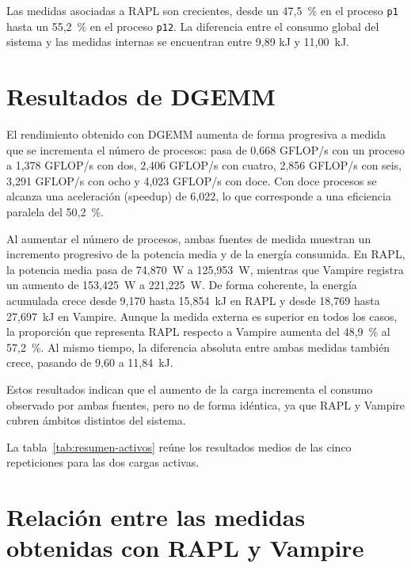 Las medidas asociadas a RAPL son crecientes, desde un 47,5~\% en el proceso \texttt{p1} hasta un 55,2~\% en el proceso \texttt{p12}. La diferencia entre el consumo global del sistema y las medidas internas se encuentran entre 9,89 kJ y 11,00~kJ. 

\section{Resultados de DGEMM}
\label{sec:resultados-dgemm}

El rendimiento obtenido con DGEMM aumenta de forma progresiva a medida que se incrementa el número de procesos: pasa de 0,668 GFLOP/s con un proceso a 1,378 GFLOP/s con dos, 2,406 GFLOP/s con cuatro, 2,856 GFLOP/s con seis, 3,291 GFLOP/s con ocho y 4,023 GFLOP/s con doce. Con doce procesos se alcanza una aceleración (speedup) de 6,022, lo que corresponde a una eficiencia paralela del 50,2~\%.

Al aumentar el número de procesos, ambas fuentes de medida muestran un incremento progresivo de la potencia media y de la energía consumida. En RAPL, la potencia media pasa de 74,870~W a 125,953~W, mientras que Vampire registra un aumento de 153,425~W a 221,225~W. De forma coherente, la energía acumulada crece desde 9,170 hasta 15,854~kJ en RAPL y desde 18,769 hasta 27,697~kJ en Vampire. Aunque la medida externa es superior en todos los casos, la proporción que representa RAPL respecto a Vampire aumenta del 48,9~\% al 57,2~\%. Al mismo tiempo, la diferencia absoluta entre ambas medidas también crece, pasando de 9,60 a 11,84~kJ.

Estos resultados indican que el aumento de la carga incrementa el consumo observado por ambas fuentes, pero no de forma idéntica, ya que RAPL y Vampire cubren ámbitos distintos del sistema.

La tabla~\ref{tab:resumen-activos} reúne los resultados medios de las cinco repeticiones para las dos cargas activas.

\begin{table}[htbp]
    \centering
    \caption{Rendimiento y medidas energéticas medias de STREAM y DGEMM.}
    \label{tab:resumen-activos}
    \resizebox{\textwidth}{!}{}
\end{table}

\section{Relación entre las medidas obtenidas con RAPL y Vampire}
\label{sec:resultados-vampire}

